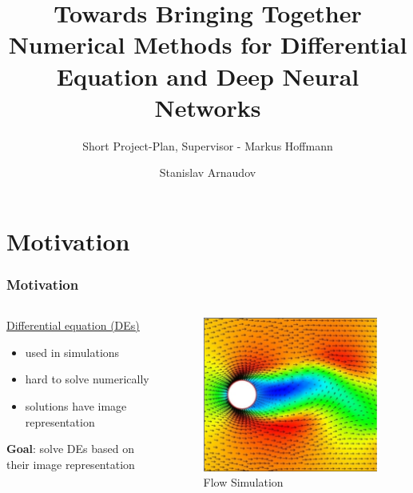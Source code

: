 \documentclass[18pt]{beamer}
\title[Short Project-Plan]{Towards Bringing Together Numerical Methods for Differential Equation and Deep Neural Networks}
\subtitle{Short Project-Plan,  Supervisor - Markus Hoffmann}
\author{Stanislav Arnaudov}
\institute{Chair for Computer Architecture and Parallel Processing}
\begin{document}
 

\begin{frame}
 \titlepage
\end{frame}


\section{Motivation}
\begin{frame}
  \frametitle{Motivation}
  \begin{columns}
    \begin{column}{0.5\textwidth}
      \large{\underline{Differential equation (DEs)}}
      \begin{itemize}
      \item used in simulations
      \item hard to solve numerically
      \item solutions have image representation
      \end{itemize}
      \vspace{0.25cm}
      \textbf{Goal}: solve DEs based on their image representation
      \vspace{-0.5cm}
    \end{column}
    \begin{column}{0.5\textwidth}
      \begin{center}
        \begin{figure}[htb]
          \includegraphics[scale=0.35]{images/pde}
          \caption{Flow Simulation\footnotemark}
        \end{figure}
      \end{center}
    \end{column}
  \end{columns}
\end{frame}
\end{document}
